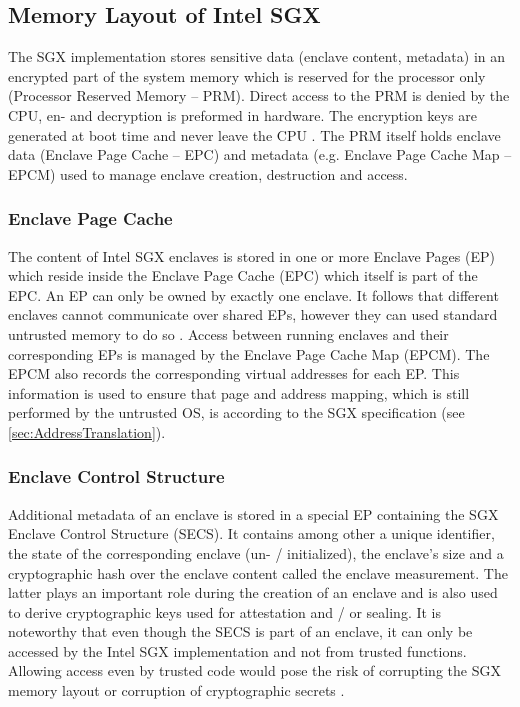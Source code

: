 \subsection{Memory Layout of Intel SGX}
The SGX implementation stores sensitive data (enclave content, metadata) in an encrypted part of the system memory which is reserved for the processor only (Processor
Reserved Memory -- PRM). Direct access to the PRM is denied by the CPU, en- and decryption is preformed in hardware. The encryption keys are generated at boot time and
never leave the CPU \cite{IntelSGXExplanation}. The PRM itself holds enclave data (Enclave Page Cache -- EPC) and metadata (e.g. Enclave Page Cache Map -- EPCM) used 
to manage enclave creation, destruction and access.

\subsubsection{Enclave Page Cache}
The content of Intel SGX enclaves is stored in one or more Enclave Pages (EP) which reside inside the Enclave Page Cache (EPC) which itself is part of the EPC. An EP
can only be owned by exactly one enclave. It follows that different enclaves cannot communicate over shared EPs, however they can used standard untrusted memory to
do so \cite{Costan2016IntelSE}. Access between running enclaves and their corresponding EPs is managed by the Enclave Page Cache Map (EPCM). The EPCM also records
the corresponding virtual addresses for each EP. This information is used to ensure that page and address mapping, which is still performed by the untrusted OS, 
is according to the SGX specification (see \cref{sec:AddressTranslation}). 

\subsubsection{Enclave Control Structure}
Additional metadata of an enclave is stored in a special EP containing the SGX Enclave Control Structure (SECS). It contains among other a unique identifier, the
state of the corresponding enclave (un- / initialized), the enclave's size and a cryptographic hash over the enclave content called the enclave measurement. The latter
plays an important role during the creation of an enclave and is also used to derive cryptographic keys used for attestation and / or sealing. It is noteworthy that even
though the SECS is part of an enclave, it can only be accessed by the Intel SGX implementation and not from trusted functions. Allowing access even by trusted code would
pose the risk of corrupting the SGX memory layout or corruption of cryptographic secrets \cite{Costan2016IntelSE}.

